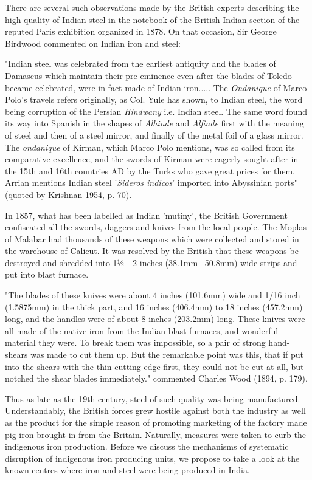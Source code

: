 There are several such observations made by the British experts describing the high quality of Indian steel in the notebook of the British Indian section of the reputed Paris exhibition organized in 1878. On that occasion, Sir George Birdwood commented on Indian iron and steel:

\begin{myquote}
"Indian steel was celebrated from the earliest antiquity and the blades of Damascus which maintain their pre-eminence even after the blades of Toledo became celebrated, were in fact made of Indian iron..... The \textit{Ondanique }of Marco Polo's travels refers originally, as Col. Yule has shown, to Indian steel, the word being corruption of the Persian \textit{Hindwany} i.e. Indian steel. The same word found its way into Spanish in the shapes of \textit{Alhinde} and \textit{Alfinde} first with the meaning of steel and then of a steel mirror, and finally of the metal foil of a glass mirror. The \textit{ondanique} of Kirman, which Marco Polo mentions, was so called from its comparative excellence, and the swords of Kirman were eagerly sought after in the 15th and 16th countries AD by the Turks who gave great prices for them. Arrian mentions Indian steel '\textit{Sideros indicos}' imported into Abyssinian ports" (quoted by Krishnan 1954, p. 70).
\end{myquote}

In 1857, what has been labelled as Indian 'mutiny', the British Government confiscated all the swords, daggers and knives from the local people. The Moplas of Malabar had thousands of these weapons which were collected and stored in the warehouse of Calicut. It was resolved by the British that these weapons be destroyed and shredded into 1½ - 2 inches (38.1mm –50.8mm) wide strips and put into blast furnace.

"The blades of these knives were about 4 inches (101.6mm) wide and 1/16 inch (1.5875mm) in the thick part, and 16 inches (406.4mm) to 18 inches (457.2mm) long, and the handles were of about 8 inches (203.2mm) long. These knives were all made of the native iron from the Indian blast furnaces, and wonderful material they were. To break them was impossible, so a pair of strong hand-shears was made to cut them up. But the remarkable point was this, that if put into the shears with the thin cutting edge first, they could not be cut at all, but notched the shear blades immediately." commented Charles Wood (1894, p. 179).

Thus as late as the 19th century, steel of such quality was being manufactured. Understandably, the British forces grew hostile against both the industry as well as the product for the simple reason of promoting marketing of the factory made pig iron brought in from the Britain. Naturally, measures were taken to curb the indigenous iron production. Before we discuss the mechanisms of systematic disruption of indigenous iron producing units, we propose to take a look at the known centres where iron and steel were being produced in India.

